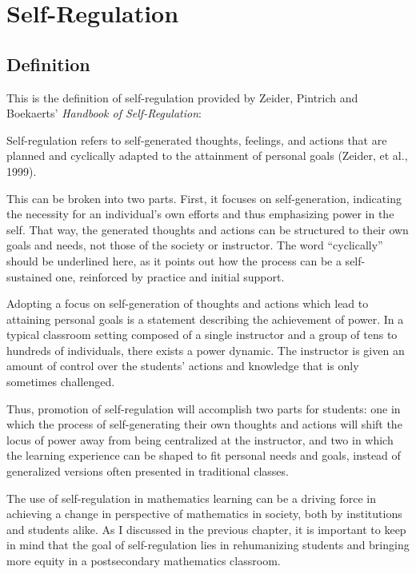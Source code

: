 \chapter{Self-Regulation}

\section{Definition}
This is the definition of self-regulation provided by Zeider, Pintrich and Boekaerts' \emph{Handbook of Self-Regulation}:
\begin{displayquote}
  Self-regulation refers to self-generated thoughts, feelings, and actions that are planned and cyclically adapted to the attainment of personal goals (Zeider, et al., 1999).
\end{displayquote}

This can be broken into two parts. First, it focuses on self-generation, indicating the necessity for an individual's own efforts and thus emphasizing power in the self. That way, the generated thoughts and actions can be structured to their own goals and needs, not those of the society or instructor. The word ``cyclically'' should be underlined here, as it points out how the process can be a self-sustained one, reinforced by practice and initial support.

Adopting a focus on self-generation of thoughts and actions which lead to attaining personal goals is a statement describing the achievement of power. In a typical classroom setting composed of a single instructor and a group of tens to hundreds of individuals, there exists a power dynamic. The instructor is given an amount of control over the students' actions and knowledge that is only sometimes challenged.

Thus, promotion of self-regulation will accomplish two parts for students: one in which the process of self-generating their own thoughts and actions will shift the locus of power away from being centralized at the instructor, and two in which the learning experience can be shaped to fit personal needs and goals, instead of generalized versions often presented in traditional classes.

The use of self-regulation in mathematics learning can be a driving force in achieving a change in perspective of mathematics in society, both by institutions and students alike. As I discussed in the previous chapter, it is important to keep in mind that the goal of self-regulation lies in rehumanizing students and bringing more equity in a postsecondary mathematics classroom.

